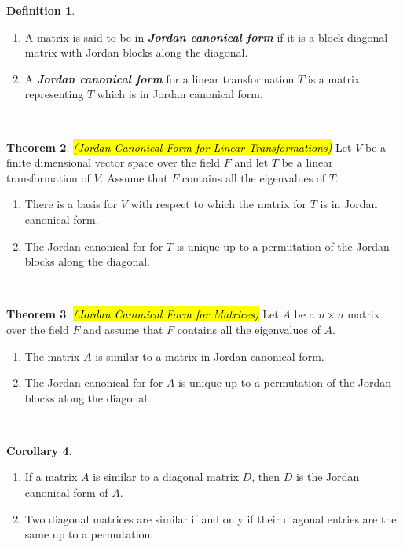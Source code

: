 \documentclass{article}
\theoremstyle{definition}
\newtheorem{thm}{Theorem}[section]
\newtheorem{cor}[thm]{Corollary}
\newtheorem{defn}[thm]{Definition}
\newcommand{\nl}{\textcolor{white}{nothing}}
\begin{document}
\begin{defn}\nl
\begin{enumerate}
\item A matrix is said to be in \textit{\textbf{Jordan canonical form}} if it is a block diagonal matrix with Jordan blocks along the diagonal.

\item A \textbf{\textit{Jordan canonical form}} for a linear transformation $T$ is a matrix representing $T$ which is in Jordan canonical form.
\end{enumerate}
\end{defn}

\nl

\begin{thm}\hl{\textit{(Jordan Canonical Form for Linear Transformations)}} Let $V$ be a finite dimensional vector space over the field $F$ and let $T$ be a linear transformation of $V$. Assume that $F$ contains all the eigenvalues of $T$.
\begin{enumerate}
\item There is a basis for $V$ with respect to which the matrix for $T$ is in Jordan canonical form.
\item The Jordan canonical for for $T$ is unique up to a permutation of the Jordan blocks along the diagonal.
\end{enumerate}
\end{thm}

\nl

\begin{thm}\hl{\textit{(Jordan Canonical Form for Matrices)}} Let $A$ be a $n\times n$ matrix over the field $F$ and assume that $F$ contains all the eigenvalues of $A$.
\begin{enumerate}
\item The matrix $A$ is similar to a matrix in Jordan canonical form.
\item The Jordan canonical for for $A$ is unique up to a permutation of the Jordan blocks along the diagonal.
\end{enumerate}
\end{thm}

\nl

\begin{cor}\nl
\begin{enumerate}
\item If a matrix $A$ is similar to a diagonal matrix $D$, then $D$ is the Jordan canonical form of $A$.
\item Two diagonal matrices are similar if and only if their diagonal entries are the same up to a permutation.
\end{enumerate}
\end{cor}
\end{document}

